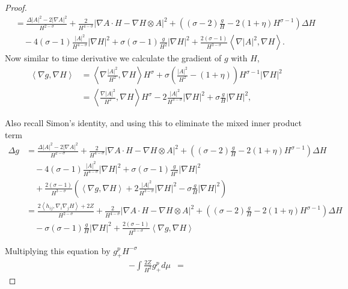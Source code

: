 \begin{proof}
\begin{align*}
        & = \frac{\Delta |A|^{2}- 2|\nabla A|^{2}}{H^{2-\sigma}} + \frac{2}{H^{4-\sigma}}| \nabla A \cdot H - \nabla H \otimes A|^{2} + \left( (\sigma-2)\frac{g}{H} - 2(1+\eta)H^{\sigma-1} \right)\Delta H \\
        & \quad - 4(\sigma -1) \frac{|A|^{2}}{H^{4-\sigma}} |\nabla H|^{2} + \sigma(\sigma -1)\frac{g}{H^{2}}|\nabla H|^{2}+ \frac{2(\sigma -1)}{H^{3-\sigma}} \left< \nabla |A|^{2}, \nabla H \right>.
    \end{align*}
    Now similar to time derivative we calculate the gradient of $ g $ with $ H $, \begin{align*}
        \left< \nabla g, \nabla H \right> & = \left< \nabla\frac{ |A|^{2}}{H^{2}}, \nabla H \right>H^{\sigma} + \sigma\left( \frac{|A|^{2}}{H^{2}} - (1+ \eta) \right) H^{\sigma-1}| \nabla H|^{2} \\
        & = \left< \frac{\nabla |A|^{2}}{H^{2}}, \nabla H \right>H^{\sigma} -2 \frac{|A|^{2}}{H^{3-\sigma}}|\nabla H|^{2}+ \sigma \frac{g}{H}| \nabla H|^{2},
    \end{align*}

    Also recall Simon's identity, and using this to eliminate the mixed inner product term 
    \begin{align*}
        \Delta g & = \frac{\Delta |A|^{2}- 2|\nabla A|^{2}}{H^{2-\sigma}} + \frac{2}{H^{4-\sigma}}| \nabla A \cdot H - \nabla H \otimes A|^{2} + \left( (\sigma-2)\frac{g}{H} - 2(1+\eta)H^{\sigma-1} \right)\Delta H \\
        & \quad - 4(\sigma -1) \frac{|A|^{2}}{H^{4-\sigma}} |\nabla H|^{2} + \sigma(\sigma -1)\frac{g}{H^{2}}|\nabla H|^{2} \\
        & \quad + \frac{2(\sigma -1)}{H^{3-\sigma}}\left( \left< \nabla g, \nabla H \right> +2 \frac{|A|^{2}}{H^{3-\sigma}}|\nabla H|^{2} - \sigma \frac{g}{H}|\nabla H|^{2} \right)  \\
        & = \frac{2\left< h_{ij}, \nabla_{i}\nabla_{j}H \right>+2Z}{H^{2-\sigma}} + \frac{2}{H^{4-\sigma}}| \nabla A \cdot H - \nabla H \otimes A|^{2} + \left( (\sigma-2)\frac{g}{H} - 2(1+\eta)H^{\sigma-1} \right)\Delta H \\
        & \quad - \sigma(\sigma-1) \frac{g}{H}|\nabla H|^{2} + \frac{2(\sigma -1)}{H^{3-\sigma}}\left< \nabla g, \nabla H \right>
    \end{align*}

    Multiplying this equation by $ g_{+}^{p}H^{-\sigma} $ \begin{align*}
        - \int \frac{2Z}{H^{2}}g_{+}^{p} d \mu & = 
    \end{align*}
   
\end{proof}